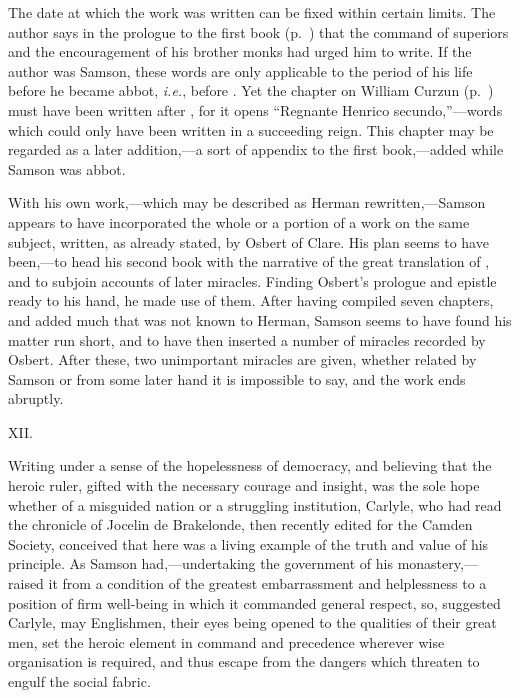 \documentclass[10pt]{book}
\begin{document}
{The date at which the work was written can be fixed within certain limits. The author says in the prologue to the first book (p.\ ) that the command of superiors and the encouragement of his brother monks had urged him to write. If the author was Samson, these words are only applicable to the period of his life before he became abbot, \emph{i.e.}, before . Yet the chapter on William Curzun (p.\ ) must have been written after , for it opens ``Regnante Henrico secundo,''---words which could only have been written in a succeeding reign. This chapter may be regarded as a later addition,---a sort of appendix to the first book,---added while Samson was abbot.

With his own work,---which may be described as Herman rewritten,---Samson appears to have incorporated the whole or a portion of a work on the same subject, written, as already stated, by Osbert of Clare. His plan seems to have been,---to head his second book with the narrative of the great translation of , and to subjoin accounts of later miracles. Finding Osbert's prologue and epistle ready to his hand, he made use of them. After having compiled seven chapters, and added much that was not known to Herman, Samson seems to have found his matter run short, and to have then inserted a number of miracles recorded by Osbert. After these, two unimportant miracles are given, whether related by Samson or from some later hand it is impossible to say, and the work ends abruptly.

\vspace{.3cm}
\begin{center}
XII.
\end{center}
\noindent Writing under a sense of the hopelessness of democracy, and believing that the heroic ruler, gifted with the necessary courage and insight, was the sole hope whether of a misguided nation or a struggling institution, Carlyle, who had read the chronicle of Jocelin de Brakelonde, then recently edited for the Camden Society, conceived that here was a living example of the truth and value of his principle. As Samson had,---undertaking the government of his monastery,---raised it from a condition of the greatest embarrassment and helplessness to a position of firm well-being in which it commanded general respect, so, suggested Carlyle, may Englishmen, their eyes being opened to the qualities of their great men, set the heroic element in command and precedence wherever wise organisation is required, and thus escape from the dangers which threaten to engulf the social fabric.

}
\end{document}

